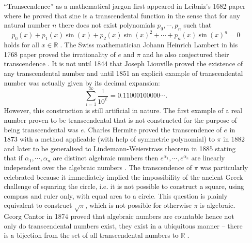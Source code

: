 \documentclass{report}
\theoremstyle{definition}
\begin{document}
``Transcendence'' as a mathematical jargon first appeared in Leibniz's 1682 paper where he proved that sine is a transcendental function in the sense that for any natural number $n$ there does not exist polynomials $p_0,\cdots,p_n$ such that
$$p_0(x)+p_1(x)\sin(x)+p_2(x)\sin(x)^2+\cdots+p_n(x)\sin(x)^n=0$$
holds for all $x\in\mathbb R$ \cite{bourbaki1998elements}. The Swiss mathematician Johann Heinrich Lambert in his 1768 paper proved the irrationality of $e$ and $\pi$ and he also conjectured their transcendence \cite{lambert2004memoire}. It is not until 1844 that Joseph Liouville proved the existence of any transcendental number and until 1851 an explicit example of transcendental number was actually given by its decimal expansion:\cite{10.2307/1988833}
$$\sum_{i=1}^\infty\frac1{10^{i!}}=0.11000100000\cdots.$$
However, this construction is still artificial in nature. The first example of a real number proven to be transcendental that is not constructed for the purpose of being transcendental was $e$. Charles Hermite proved the transcendence of $e$ in 1873 with a method applicable (with help of symmetric polynomial) to $\pi$ in 1882 and later to be generalised to Lindemann-Weierstrass theorem in 1885 stating that if $\alpha_1,\cdots, \alpha_n$ are distinct algebraic numbers then $e^{\alpha_1},\cdots,e^{\alpha_n}$ are linearly independent over the algebraic numbers \cite{baker1990transcendental}. The transcendence of $\pi$ was particularly celebrated because it immediately implied the impossibility of the ancient Greek challenge of squaring the circle, i.e. it is not possible to construct a square, using compass and ruler only, with equal area to a circle. This question is plainly equivalent to construct $\sqrt\pi$, which is not possible for otherwise $\pi$ is algebraic. Georg Cantor in 1874 proved that algebraic numbers are countable hence not only do transcendental numbers exist, they exist in a ubiquitous manner -- there is a bijection from the set of all transcendental numbers to $\mathbb R$ \cite{cantor1932uber,cantor1878beitrag}.
\end{document}

